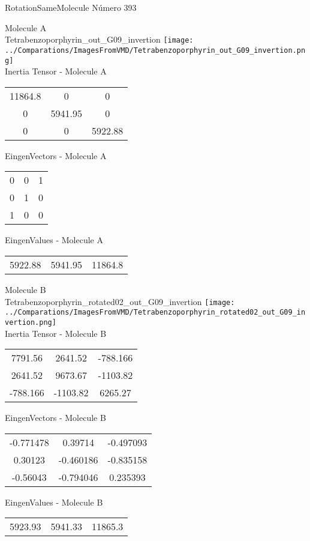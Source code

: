 \vtab[-2cm]
\begin{center}
{\large RotationSameMolecule \tab Número 393}
\end{center}
\begin{multicols}{2}
\begin{center}

Molecule A \\ 
Tetrabenzoporphyrin\_out\_G09\_invertion
\texttt{[image: ../Comparations/ImagesFromVMD/Tetrabenzoporphyrin\_out\_G09\_invertion.png]}
\\
Inertia Tensor - Molecule A \\
\vtab

\begin{tabular}{|c c c|}
11864.8	 & 	0	 & 	0	 \\
0	 & 	5941.95	 & 	0	 \\
0	 & 	0	 & 	5922.88
\end{tabular}

\vtab
 EingenVectors - Molecule A     \\
\vtab
\begin{tabular}{|c c c|}
0	 & 	0	 & 	1	 \\
0	 & 	1	 & 	0	 \\
1	 & 	0	 & 	0
\end{tabular}

\vtab
 EingenValues - Molecule A     \\
\vtab
\begin{tabular}{|c c c|}
5922.88	 & 	5941.95	 & 	11864.8	 \\
\end{tabular}
\columnbreak

Molecule B \\ 
Tetrabenzoporphyrin\_rotated02\_out\_G09\_invertion
\texttt{[image: ../Comparations/ImagesFromVMD/Tetrabenzoporphyrin\_rotated02\_out\_G09\_invertion.png]}
\\
Inertia Tensor - Molecule B \\
\vtab

\begin{tabular}{|c c c|}
7791.56	 & 	2641.52	 & 	-788.166	 \\
2641.52	 & 	9673.67	 & 	-1103.82	 \\
-788.166	 & 	-1103.82	 & 	6265.27
\end{tabular}

\vtab
 EingenVectors - Molecule B     \\
\vtab
\begin{tabular}{|c c c|}
-0.771478	 & 	0.39714	 & 	-0.497093	 \\
0.30123	 & 	-0.460186	 & 	-0.835158	 \\
-0.56043	 & 	-0.794046	 & 	0.235393
\end{tabular}

\vtab
 EingenValues - Molecule B     \\
\vtab
\begin{tabular}{|c c c|}
5923.93	 & 	5941.33	 & 	11865.3	 \\
\end{tabular}

\end{center}
\end{multicols}
